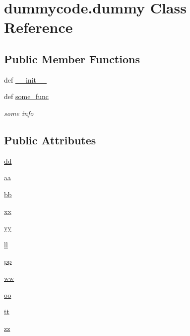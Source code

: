 \section{dummycode.\-dummy Class Reference}
\label{classdummycode_1_1dummy}
\subsection*{Public Member Functions}
\begin{DoxyCompactItemize}
\item 
def \hyperlink{classdummycode_1_1dummy_a674a0e2c1a4f640d13fb13be91869cec}{\-\_\-\-\_\-init\-\_\-\-\_\-}
\item 
def \hyperlink{classdummycode_1_1dummy_a7646a5afb54e46a4ea577bafcb73a4e7}{some\-\_\-func}
\begin{DoxyCompactList}\small\item\em some info \end{DoxyCompactList}\end{DoxyCompactItemize}
\subsection*{Public Attributes}
\begin{DoxyCompactItemize}
\item 
\hyperlink{classdummycode_1_1dummy_af2feb69e325549343d505d0f5afaacd0}{dd}
\item 
\hyperlink{classdummycode_1_1dummy_ade8c2a23728fea407400de565af9d924}{aa}
\item 
\hyperlink{classdummycode_1_1dummy_a8fc4a473d7dc65b38abc8ca2bbf56d0c}{bb}
\item 
\hyperlink{classdummycode_1_1dummy_af1ae41fb24a1c0a52ae60bd1f2db9f5f}{xx}
\item 
\hyperlink{classdummycode_1_1dummy_ad0f056c4695b2525f883dbe1004fa7ba}{yy}
\item 
\hyperlink{classdummycode_1_1dummy_aff4159330a4c573597b401b5503818d7}{ll}
\item 
\hyperlink{classdummycode_1_1dummy_a4ded8e4fa38d817b96c7b21a869a16ae}{pp}
\item 
\hyperlink{classdummycode_1_1dummy_a65b1604eb43ffa41eb49a02655397fb7}{ww}
\item 
\hyperlink{classdummycode_1_1dummy_a49635a45286e102fb960d0bc4f4c3621}{oo}
\item 
\hyperlink{classdummycode_1_1dummy_ac1a6206c9bd102d051018258c3b54de9}{tt}
\item 
\hyperlink{classdummycode_1_1dummy_af5c829ccdb5a89e8ba0f2cf476cb2aa0}{zz}
\end{DoxyCompactItemize}


